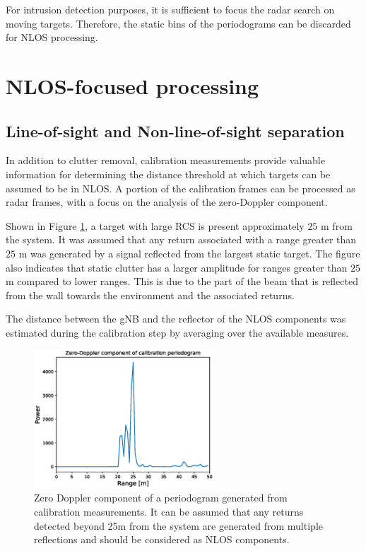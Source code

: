 	For intrusion detection purposes, it is sufficient to focus the radar search on moving targets. 
	Therefore, the static bins of the periodograms can be discarded for NLOS processing.
	
	
	\section{NLOS-focused processing}
	\label{sec:nlos_proc_pipeline}
	
		\subsection{Line-of-sight and Non-line-of-sight separation}
		\label{sec:los_nlos_separation}
		
		
		
			In addition to clutter removal, calibration measurements provide valuable information for determining the distance threshold at which targets can be assumed to be in NLOS. 
			A portion of the calibration frames can be processed as radar frames, with a focus on the analysis of the zero-Doppler component.
			
			Shown in Figure \ref{fig:Test1_cali_static_per}, a target with large RCS is present approximately $25$ m from the system. It was assumed that any return associated with a range greater than $25$ m was generated by a signal reflected from the largest static target. The figure also indicates that static clutter has a larger amplitude for ranges greater than $25$ m compared to lower ranges. This is due to the part of the beam that is reflected from the wall towards the environment and the associated returns.
			
			The distance between the gNB and the reflector of the NLOS components was estimated during the calibration step by averaging over the available measures.
			
			
			\begin{figure}[H]
				\centering
				\includegraphics[width=0.6\textwidth]{Images/Test1/cali_static_per_t1.eps}
				\caption{\small Zero Doppler component of a periodogram generated from calibration measurements. It can be assumed that any returns detected beyond 25m from the system are generated from multiple reflections and should be considered as NLOS components. }
				\label{fig:Test1_cali_static_per}
			\end{figure}
		
